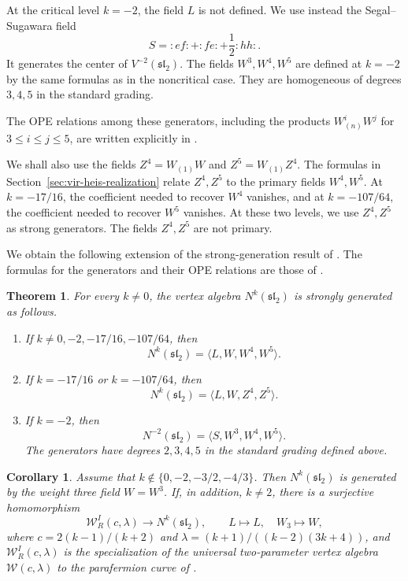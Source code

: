 \documentclass[11 pt]{amsart}
\newtheorem{theorem}{Theorem}
\newtheorem{corollary}{Corollary}
\theoremstyle{definition}
\theoremstyle{plain}
\begin{document}
At the critical level $k=-2$, the field $L$ is not defined.  We use instead
the Segal--Sugawara field
\begin{equation}\label{eq:S}
S=:ef:+:fe:+\frac12:hh:.
\end{equation}
It generates the center of $V^{-2}(\mathfrak{sl}_2)$.  The fields
$W^3,W^4,W^5$ are defined at $k=-2$ by the same formulas as in
the noncritical case.  They are homogeneous of degrees $3,4,5$ in the standard
grading.

The OPE relations among these generators, including the
products $W^i_{(n)}W^j$ for $3\leq i\leq j\leq 5$, are written explicitly in
\cite[Appendices A and B]{DLY}.

We shall also use the fields $Z^4=W_{(1)}W$ and
$Z^5=W_{(1)}Z^4$.
The formulas in Section~\ref{sec:vir-heis-realization} relate
$Z^4,Z^5$ to the primary fields $W^4,W^5$. At $k=-17/16$, the
coefficient needed to recover $W^4$ vanishes, and at $k=-107/64$, the
coefficient needed to recover $W^5$ vanishes. At these two levels, we
use $Z^4,Z^5$ as strong generators. The fields $Z^4,Z^5$ are not
primary.

We obtain the following extension of the strong-generation result of
\cite{DLWY}.  The formulas for the generators and their OPE relations are
those of \cite{DLY}.

\begin{theorem}\label{thm:strong-generation}
For every $k\neq0$, the vertex algebra $N^k(\mathfrak{sl}_2)$ is strongly
generated as follows.
\begin{enumerate}[label=\textup{(\roman*)}]
\item If $k\neq0,-2,-17/16,-107/64$, then
\[
  N^k(\mathfrak{sl}_2)=\langle L,W,W^4,W^5\rangle .
\]
\item If $k=-17/16$ or $k=-107/64$, then
\[
  N^k(\mathfrak{sl}_2)=\langle L,W,Z^4,Z^5\rangle .
\]
\item If $k=-2$, then
\[
  N^{-2}(\mathfrak{sl}_2)=\langle S,W^3,W^4,W^5\rangle .
\]
The generators have degrees $2,3,4,5$ in the standard grading defined
above.
\end{enumerate}
\end{theorem}

\begin{corollary}\label{cor:weak-generation-LW}
Assume that $k\notin\{0,-2,-3/2,-4/3\}$.
Then $N^k(\mathfrak{sl}_2)$ is generated by the weight three field
$W=W^3$.
If, in addition, $k\neq2$, there is a surjective homomorphism
\[
 \mathcal W^I_R(c,\lambda)\longrightarrow N^k(\mathfrak{sl}_2),
 \qquad L\longmapsto L,\quad W_3\longmapsto W,
\]
where $c=2(k-1)/(k+2)$ and
$\lambda=(k+1)/((k-2)(3k+4))$,
and $\mathcal W^I_R(c,\lambda)$ is the specialization of the universal
two-parameter vertex algebra $\mathcal W(c,\lambda)$ to the
parafermion curve of \cite[Theorem~7.1]{LinshawWinfty}.
\end{corollary}
\end{document}

